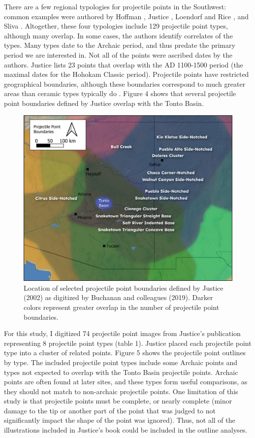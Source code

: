 \documentclass[a4paper]{article}
\begin{document}
There are a few regional typologies for projectile points in the Southwest: common examples were authored by Hoffman \autocite*{Hoffman1997-hb}, Justice \autocite*{Justice2002-cf}, Loendorf and Rice \autocite*{Loendorf2004-tp}, and Sliva \autocite*{Sliva2006-nq}. Altogether, these four typologies include 129 projectile point types, although many overlap. In some cases, the authors identify correlates of the types. Many types date to the Archaic period, and thus predate the primary period we are interested in. Not all of the points were ascribed dates by the authors. Justice lists 23 points that overlap with the AD 1100-1500 period (the maximal dates for the Hohokam Classic period). Projectile points have restricted geographical boundaries, although these boundaries correspond to much greater areas than ceramic types typically do \autocite{Buchanan2019-vn}. Figure 4 shows that several projectile point boundaries defined by Justice overlap with the Tonto Basin.

\begin{figure}
\includegraphics[width=1\linewidth]{figures/ProjPointBoundaries} \caption{Location of selected projectile point boundaries defined by Justice (2002) as digitized by Buchanan and colleagues (2019). Darker colors represent greater overlap in the number of projectile point boundaries.}\label{fig:ProjectilePointBoundaries}
\end{figure}

For this study, I digitized 74 projectile point images from Justice's publication representing 8 projectile point types (table 1). Justice placed each projectile point type into a cluster of related points. Figure 5 shows the projectile point outlines by type. The included projectile point types include some Archaic points and types not expected to overlap with the Tonto Basin projectile points. Archaic points are often found at later sites, and these types form useful comparisons, as they should not match to non-archaic projectile points. One limitation of this study is that projectile points must be complete, or nearly complete (minor damage to the tip or another part of the point that was judged to not significantly impact the shape of the point was ignored). Thus, not all of the illustrations included in Justice's book could be included in the outline analyses.
\end{document}
